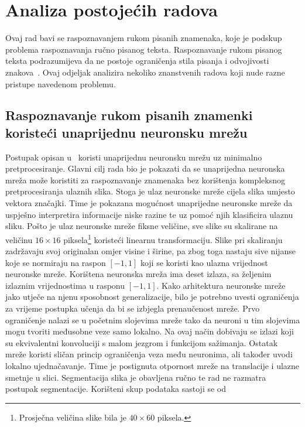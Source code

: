 \section{Analiza postojećih radova}
\label{sec:analiza-postojecih-radova}
Ovaj rad bavi se raspoznavanjem rukom pisanih znamenaka, koje je podskup problema raspoznavanja ručno pisanog teksta.
Raspoznavanje rukom pisanog teksta podrazumijeva da ne postoje ograničenja stila pisanja i odvojivosti
znakova\ \citep{mantas1986}. Ovaj odjeljak analizira nekoliko znanstvenih radova koji nude razne pristupe navedenom
problemu.

\subsection{Raspoznavanje rukom pisanih znamenki koristeći unaprijednu neuronsku mrežu}
\label{subsec:raspoznavanje-rukom-pisanih-znakova-koristeci-unaprijednu-neuronsku-mrezu}
Postupak opisan u\ \citep{leCun1990} koristi unaprijednu neuronsku mrežu uz minimalno pretprocesiranje. Glavni cilj rada
bio je pokazati da se unaprijedna neuronska mreža može koristiti za raspoznavanje znamenaka bez korištenja kompleksnog
pretprocesiranja ulaznih slika. Stoga je ulaz neuronske mreže cijela slika umjesto vektora značajki. Time je pokazana
mogućnost unaprijedne neuronske mreže da uspješno interpretira informacije niske razine te uz pomoć njih klasificira
ulaznu sliku. Pošto je ulaz neuronske mreže fiksne veličine, sve slike su skalirane na veličinu $16 \times 16$
piksela\footnote{Prosječna veličina slike bila je $40 \times 60$ piksela.} koristeći linearnu transformaciju. Slike pri
skaliranju zadržavaju svoj originalan omjer visine i širine, pa zbog toga nastaju sive nijanse koje se normiraju na
raspon $[-1, 1]$ koji se koristi kao ulazna vrijednost neuronske mreže. Korištena neuronska mreža ima deset izlaza, sa
željenim izlaznim vrijednostima u rasponu $[-1, 1]$. Kako arhitektura neuronske mreže jako utječe na njenu sposobnost
generalizacije, bilo je potrebno uvesti ograničenja za vrijeme postupka učenja da bi se izbjegla prenaučenost mreže.
Prvo ograničenje nalazi se u početnim slojevima mreže tako da neuroni u tim slojevima mogu tvoriti međusobne veze
samo lokalno. Na ovaj način dobivaju se izlazi koji su ekvivalentni konvoluciji s malom jezgrom i funkcijom sažimanja.
Ostatak mreže koristi sličan princip ograničenja veza među neuronima, ali također uvodi lokalno ujednačavanje. Time je
postignuta otpornost mreže na translacije i ulazne smetnje u slici.
Segmentacija slika je obavljena ručno te rad ne razmatra postupak segmentacije. Korišteni skup podataka sastoji se od
